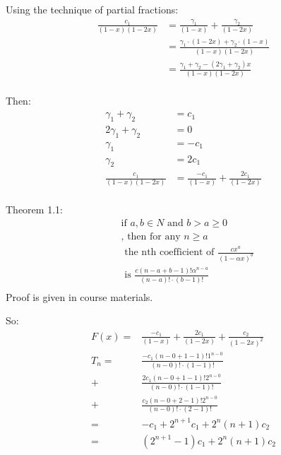 \documentclass[12pt, letterpaper, twoside]{article}
\begin{document}
Using the technique of partial fractions:
\begin{equation}
    \begin{split}
    \frac{c_1}{(1-x)(1-2x)} & = \frac{\gamma_1}{(1-x)} + \frac{\gamma_2}{(1-2x)} \\
    & = \frac{\gamma_1 \cdot (1-2x) + \gamma_2 \cdot (1-x)}{(1-x)(1-2x)} \\
    & = \frac{\gamma_1 + \gamma_2 - (2 \gamma_1 + \gamma_2) x}{(1-x)(1-2x)} \\
\end{split}
\end{equation}

Then:
\begin{equation} \label{eq5}
    \begin{split}
    \gamma_1 + \gamma_2 & = c_1 \\
    2 \gamma_1 + \gamma_2 & = 0 \\
    \gamma_1 & = -c_1 \\
    \gamma_2 & = 2c_1 \\
    \frac{c_1}{(1-x)(1-2x)} & = \frac{-c_1}{(1-x)} + \frac{2c_1}{(1-2x)} \\
\end{split}
\end{equation}

Theorem 1.1:
\begin{equation} \label{eq6}
\begin{split}
&\text{if } a, b \in N \text{ and } b > a \geq 0 \\
&\text{, then for any } n \geq a \\
&\text{ the nth coefficient of } \frac{c x^a}{(1-\alpha x)^b} \\
&\text{ is } \frac{c (n-a+b-1)! \alpha^{n-a}}{(n-a)! \cdot (b-1)!} \\
\end{split}
\end{equation}
Proof is given in course materials.

So:
\begin{equation} \label{eq6}
    \begin{split}
    F(x) = & \frac{-c_1}{(1-x)} + \frac{2c_1}{(1-2x)} + \frac{c_2}{(1-2x)^2} \\
    T_n = & \frac{-c_1 (n-0+1-1)! 1^{n-0}}{(n-0)! \cdot (1-1)!} \\
    + & \frac{2 c_1 (n-0+1-1)! 2^{n-0}}{(n-0)! \cdot (1-1)!} \\
    + & \frac{c_2 (n-0+2-1)! 2^{n-0}}{(n-0)! \cdot (2-1)!} \\
    = & -c_1 + 2^{n+1} c_1 + 2^n (n+1) c_2 \\
    = & (2^{n+1} -1) c_1 + 2^n (n+1) c_2 \\
\end{split}
\end{equation}
\end{document}
